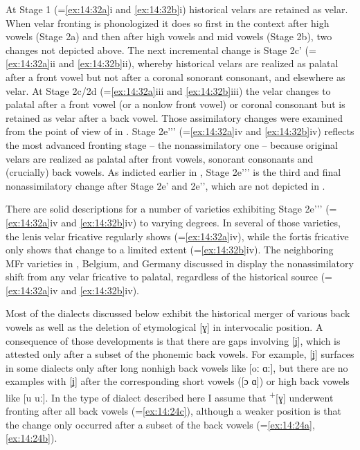 At Stage 1 (=\ref{ex:14:32a}i and \ref{ex:14:32b}i) historical velars are retained as velar. When velar fronting is phonologized it does so first in the context after high vowels (Stage 2a) and then after high vowels and mid vowels (Stage 2b), two changes not depicted above. The next incremental change is Stage 2c' (=\ref{ex:14:32a}ii and \ref{ex:14:32b}ii), whereby historical velars are realized as palatal after a front vowel but not after a coronal sonorant consonant, and elsewhere as velar. At Stage 2c/2d (=\ref{ex:14:32a}iii and \ref{ex:14:32b}iii) the velar changes to palatal after a front vowel (or a nonlow front vowel) or coronal consonant but is retained as velar after a back vowel. Those assimilatory changes were examined from the point of view of  in . Stage 2e'{}'{}' (=\ref{ex:14:32a}iv and \ref{ex:14:32b}iv) reflects the most advanced fronting stage -- the nonassimilatory one -- because original velars are realized as palatal after front vowels, sonorant consonants and (crucially) back vowels. As indicted earlier in , Stage 2e'{}'{}' is the third and final nonassimilatory change after Stage 2e' and 2e'{}', which are not depicted in .

There are solid descriptions for a number of varieties exhibiting Stage 2e'{}'{}' (=\ref{ex:14:32a}iv and \ref{ex:14:32b}iv) to varying degrees. In several of those varieties, the lenis velar fricative regularly shows  (=\ref{ex:14:32a}iv), while the fortis fricative only shows that change to a limited extent (=\ref{ex:14:32b}iv). The neighboring MFr varieties in , Belgium, and Germany discussed in  display the nonassimilatory shift from any velar fricative to palatal, regardless of the historical source (=\ref{ex:14:32a}iv and \ref{ex:14:32b}iv).

Most of the dialects discussed below exhibit the historical merger of various back vowels as well as the deletion of etymological [ɣ] in intervocalic position. A consequence of those developments is that there are gaps involving [ʝ], which is attested only after a subset of the phonemic back vowels. For example, [ʝ] surfaces in some dialects only after long nonhigh back vowels like [oː ɑː], but there are no examples with [ʝ] after the corresponding short vowels ([ɔ ɑ]) or high back vowels like [u uː]. In the type of dialect described here I assume that  \textsuperscript{+}[ɣ] underwent fronting after all back vowels (=\ref{ex:14:24c}), although a weaker position is that the change only occurred after a subset of the back vowels (=\ref{ex:14:24a}, \ref{ex:14:24b}).

